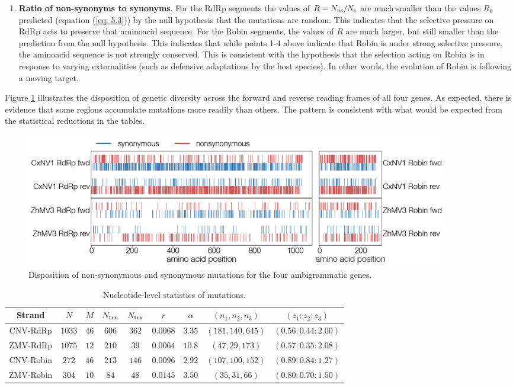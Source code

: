 \documentclass[unnumsec,webpdf,contemporary,large,namedate]{oup-authoring-template}%
\theoremstyle{thmstyleone}%
\theoremstyle{thmstyletwo}%
\theoremstyle{thmstylethree}%
\begin{document}
\begin{enumerate}
\item{\bf Ratio of non-synonyms to synonyms}. For the RdRp segments the values of 
$R=N_{\rm ns}/N_{\rm s}$ are much smaller than the values $R_0$ 
predicted (equation (\ref{eq: 5.3})) by the null hypothesis that the mutations are random. This indicates that the selective
pressure on RdRp acts to preserve that aminoacid sequence. For the Robin segments, the values of $R$ 
are much larger, but still smaller than the prediction from the null hypothesis. This indicates that while
points 1-4 above indicate that Robin is under strong selective pressure, the aminoacid sequence 
is not strongly conserved. 
This is consistent with the hypothesis that the selection acting on Robin is in response to varying externalities   
(such as defensive adaptations by the host species). In other words, the evolution of Robin is following a moving target.

\end{enumerate}

Figure \ref{fig: 2} illustrates the disposition of genetic diversity across the forward and reverse reading frames 
of all four genes. As expected, there is evidence that some regions accumulate mutations more readily than others. 
The pattern is consistent with what would be expected from the statistical reductions in the tables.

\begin{figure}
\begin{center}
\includegraphics[width=0.9\textwidth]{narna-diversity.png}
\caption{\label{fig: 2}
Disposition of non-synonymous  and synonymous mutations for the four ambigrammatic genes.
}
\end{center}
\end{figure}

\begin{table}
\centering
\begin{tabular}{|c|c|c|c|c|c|c|c|c|}
\hline
Strand&$N$&$M$&$N_{\rm trn}$&$N_{\rm trv}$&$r$&$\alpha$&$(n_1,n_2,n_3)$&$(z_1:z_2:z_3)$\\ 
\hline
CNV-RdRp&$1033$  &$46$ &$606$ &$362$&$0.0068$&$3.35$ &$(181,140,645)$&$(0.56:0.44:2.00)$\\ 
ZMV-RdRp&$1075$ &$12$&$210$ &$39$& $0.0064$ &$10.8$ &$(47,29,173)$&$(0.57:0.35:2.08)$\\ 
CNV-Robin&$272$    &$46$ &$213$ &$146$&$0.0096$&$2.92$ &$(107,100,152)$&$(0.89:0.84:1.27)$\\ 
ZMV-Robin&$304$&$10$&$84$&$48$&$0.0145$&$3.50$&$(35,31,66)$&$(0.80:0.70:1.50)$\\ 
\hline
\end{tabular}
\caption{
\centering
Nucleotide-level statistics of mutations. 
\label{tab: 5.1}}
\end{table}
\end{document}

